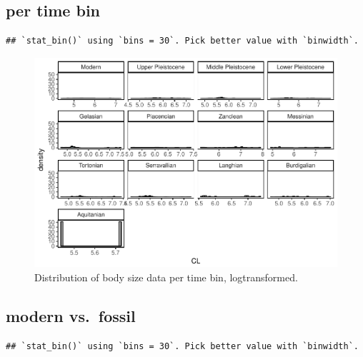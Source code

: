 \documentclass[]{article}
\begin{document}
\newpage

\subsection{per time bin}\label{per-time-bin}

\begin{verbatim}
## `stat_bin()` using `bins = 30`. Pick better value with `binwidth`.
\end{verbatim}

\begin{figure}[htbp]
\centering
\includegraphics{MA_JJ_files/figure-latex/Histograms of body size data, per time bin-1.pdf}
\caption{Distribution of body size data per time bin, logtransformed.}
\end{figure}

\newpage

\subsection{modern vs.~fossil}\label{modern-vs.fossil}

\begin{verbatim}
## `stat_bin()` using `bins = 30`. Pick better value with `binwidth`.
\end{verbatim}
\end{document}

